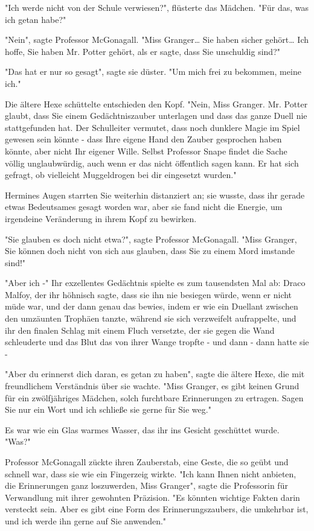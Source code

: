 {"Ich werde nicht von der Schule verwiesen?", flüsterte das Mädchen. "Für das, was ich getan habe?"

"Nein", sagte Professor McGonagall. "Miss Granger… Sie haben sicher gehört… Ich hoffe, Sie haben Mr. Potter gehört, als er sagte, dass Sie unschuldig sind?"

"Das hat er nur so gesagt", sagte sie düster. "Um mich frei zu bekommen, meine ich."

Die ältere Hexe schüttelte entschieden den Kopf. "Nein, Miss Granger. Mr. Potter glaubt, dass Sie einem Gedächtniszauber unterlagen und dass das ganze Duell nie stattgefunden hat. Der Schulleiter vermutet, dass noch dunklere Magie im Spiel gewesen sein könnte - dass Ihre eigene Hand den Zauber gesprochen haben könnte, aber nicht Ihr eigener Wille. Selbst Professor Snape findet die Sache völlig unglaubwürdig, auch wenn er das nicht öffentlich sagen kann. Er hat sich gefragt, ob vielleicht Muggeldrogen bei dir eingesetzt wurden."

Hermines Augen starrten Sie weiterhin distanziert an; sie wusste, dass ihr gerade etwas Bedeutsames gesagt worden war, aber sie fand nicht die Energie, um irgendeine Veränderung in ihrem Kopf zu bewirken.

"Sie glauben es doch nicht etwa?", sagte Professor McGonagall. "Miss Granger, Sie können doch nicht von sich aus glauben, dass Sie zu einem Mord imstande sind!"

"Aber ich -" Ihr exzellentes Gedächtnis spielte es zum tausendsten Mal ab: Draco Malfoy, der ihr höhnisch sagte, dass sie ihn nie besiegen würde, wenn er nicht müde war, und der dann genau das bewies, indem er wie ein Duellant zwischen den umzäunten Trophäen tanzte, während sie sich verzweifelt aufrappelte, und ihr den finalen Schlag mit einem Fluch versetzte, der sie gegen die Wand schleuderte und das Blut das von ihrer Wange tropfte - und dann - dann hatte sie -

"Aber du erinnerst dich daran, es getan zu haben", sagte die ältere Hexe, die mit freundlichem Verständnis über sie wachte. "Miss Granger, es gibt keinen Grund für ein zwölfjähriges Mädchen, solch furchtbare Erinnerungen zu ertragen. Sagen Sie nur ein Wort und ich schließe sie gerne für Sie weg."

Es war wie ein Glas warmes Wasser, das ihr ins Gesicht geschüttet wurde.\\ "Was?"

Professor McGonagall zückte ihren Zauberstab, eine Geste, die so geübt und schnell war, dass sie wie ein Fingerzeig wirkte. "Ich kann Ihnen nicht anbieten, die Erinnerungen ganz loszuwerden, Miss Granger", sagte die Professorin für Verwandlung mit ihrer gewohnten Präzision. "Es könnten wichtige Fakten darin versteckt sein. Aber es gibt eine Form des Erinnerungszaubers, die umkehrbar ist, und ich werde ihn gerne auf Sie anwenden."

}
